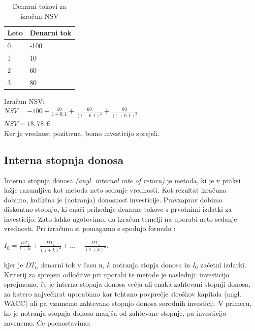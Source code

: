 \documentclass[12pt, a4paper]{amsart}
\theoremstyle{definition} %
\theoremstyle{plain} %
\begin{document}
\begin{table}[ht]
	\caption{Denarni tokovi za izračun NSV}
	\centering
	\begin{tabular}{|L|L|}
	\hline
	\textbf{Leto} & \textbf{Denarni tok} \\
	\hline
	&-100\\
	&10\\
	&60\\
	&80\\
	\hline
	\end{tabular}
\end{table}

Izračun NSV:\\
$NSV = -100 + \tfrac{10}{1+0,1} + \tfrac{60}{(1+0,1)^2} + \tfrac{80}{(1+0,1)^3}$ \\[0,5 cm]
$NSV = 18,78$ €  \\

Ker je vrednost pozitivna, bomo investicijo sprejeli.

\subsection{Interna stopnja donosa}
Interna stopnja donosa \textit{(angl. internal rate of return)} je metoda, ki je v praksi lažje razumljiva kot metoda neto sedanje vrednosti. Kot rezultat izračuna dobimo, kolikšna je (notranja) donosnost investicije. Pravzaprav dobimo diskontno stopnjo, ki enači prihodnje denarne tokove s prvotnimi izdatki za investicijo. Zato lahko ugotovimo, da izračun temelji na uporabi neto sedanje vrednosti. Pri izračunu si pomagamo s spodnjo formulo \cite[str. 156]{Mramor}:\\

\begin{center}
$I_0 = \tfrac{DT_1}{1+k} + \tfrac{DT_2}{(1+k)^2} + ... + \tfrac{DT_n}{(1+k)^n}$,\\
\end{center}

kjer je $DT_n$ denarni tok v času n, $k$ notranja stopja donosa in $I_0$ začetni izdatki. \\

Kriterij za sprejem odločitve pri uporabi te metode je naslednji: investicijo sprejmemo, če je interna stopnja donosa večja ali enaka zahtevani stopnji donosa, za katero največkrat uporabimo kar tehtano povprečje stroškov kapitala (angl. WACC) ali pa vzamemo zahtevano stopnjo donosa sorodnih investicij. V primeru, ko je notranja stopnja donosa manjša od zahtevane stopnje, pa investicijo zavrnemo. Če poenostavimo:
\end{document}
